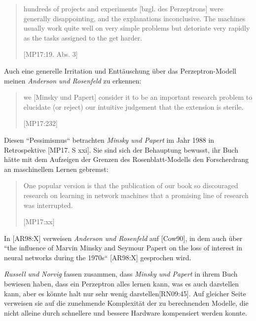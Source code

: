 \footnotetext[39]{
    [MP17,S. 1-20]
}

\blockquote[{[MP17:19. Abs. 3]}]{
hundreds of projects and experiments [bzgl. des Perzeptrons] were generally disappointing, and the explanations inconclusive. The machines usually work quite well on very simple problems but detoriate very rapidly as the tasks assigned to the get harder.
}

\noindent
Auch eine generelle Irritation und Enttäuschung über das Perzeptron-Modell meinen \textit{Anderson und Rosenfeld} zu erkennen:

\blockquote[{[MP17:232]}]{
we [Minsky und Papert] consider it to be an important research problem to elucidate (or reject) our intuitive judgement that the extension is sterile.
}

\noindent
Diesen ``Pessimismus`` betrachten \textit{Minsky und Papert} im Jahr 1988 in Retrospektive [MP17. S xxi]. Sie sind sich der Behauptung bewusst, ihr Buch hätte mit dem Aufzeigen der Grenzen des Rosenblatt-Modells den Forscherdrang an maschinellem Lernen gebremst:

\blockquote[{[MP17:xx]}]{
One popular version is  that the publication of our book so discouraged research on learning in network machines that a promising line of research was interrupted.
}

\noindent
In  [AR98:X] verweisen \textit{Anderson und Rosenfeld} auf [Cow90], in dem auch über ``the influence of Marvin Minsky and Seymour Papert on the loss of interest in neural networks during the 1970s`` [AR98:X] gesprochen wird.

\textit{Russell und Norvig} fassen zusammen, dass \textit{Minsky und Papert} in ihrem Buch bewiesen haben, dass ein Perzeptron alles lernen kann, was es auch darstellen kann, aber es könnte halt nur sehr wenig darstellen[RN09:45]\footnotemark[40]. Auf gleicher Seite verweisen sie auf die zunehmende Komplexität der zu berechnenden Modelle, die nicht alleine durch schnellere und bessere Hardware kompensiert werden konnte.

